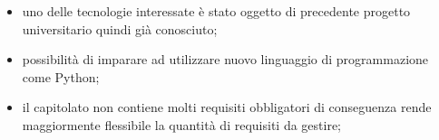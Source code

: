 \begin{itemize}
\item uno delle tecnologie interessate è stato oggetto di precedente progetto universitario quindi già conosciuto;
\item possibilità di imparare ad utilizzare nuovo linguaggio di programmazione come Python;
\item il capitolato non contiene molti requisiti obbligatori di conseguenza rende maggiormente flessibile la quantità di requisiti da gestire;
\end{itemize}